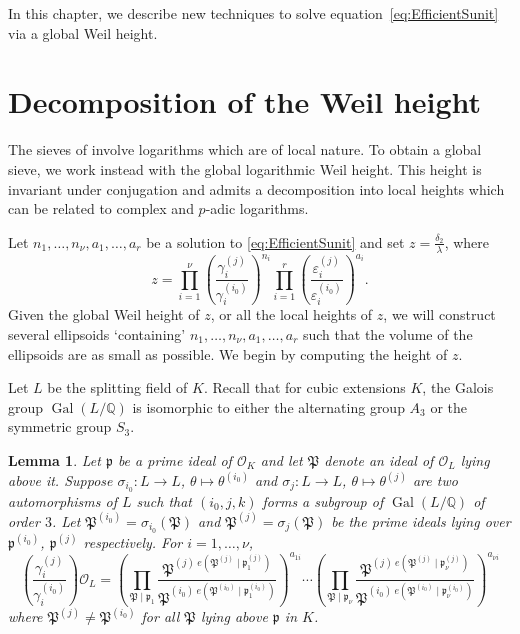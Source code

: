 \documentclass[11pt]{report}
\newtheorem{lemma}[theorem]{Lemma}
\theoremstyle{definition}
\DeclareMathOperator{\Gal}{Gal}
\begin{document}
In this chapter, we describe new techniques to solve equation~\eqref{eq:EfficientSunit} via a global Weil height.


\section{Decomposition of the Weil height}
\label{sec:decomp-weil-height}

The sieves of \cite{TW3} involve logarithms which are of local nature. To obtain a global sieve, we work instead with the global logarithmic Weil height. This height is invariant under conjugation and admits a decomposition into local heights which can be related to complex and $p$-adic logarithms.

Let $n_1, \dots, n_{\nu}, a_1, \dots, a_r$ be a solution to \eqref{eq:EfficientSunit} and set $z = \frac{\delta_2}{\lambda}$, where
\[z = \prod_{i = 1}^{\nu} \left( \frac{\gamma_i^{(j)}}{\gamma_i^{(i_0)}}\right)^{n_i}\prod_{i = 1}^{r}\left( \frac{\varepsilon_i^{(j)}}{\varepsilon_i^{(i_0)}}\right)^{a_i}.\]
Given the global Weil height of $z$, or all the local heights of $z$, we will construct several ellipsoids `containing' $n_1, \dots, n_{\nu}, a_1, \dots, a_r$ such that the volume of the ellipsoids are as small as possible. We begin by computing the height of $z$.

Let $L$ be the splitting field of $K$. Recall that for cubic extensions $K$, the Galois group $\Gal(L/\mathbb{Q})$ is isomorphic to either the alternating group $A_3$ or the symmetric group $S_3$.

\begin{lemma}\label{lem:cancellation}
Let $\mathfrak{p}$ be a prime ideal of $\mathcal{O}_K$ and let $\mathfrak{P}$ denote an ideal of $\mathcal{O}_L$ lying above it. Suppose $\sigma_{i_0}: L \to L$, $\theta \mapsto \theta^{(i_0)}$ and $\sigma_{j}: L \to L$, $\theta \mapsto \theta^{(j)}$ are two automorphisms of $L$ such that $(i_0,j,k)$ forms a subgroup of $\Gal(L/\mathbb{Q})$ of order $3$. Let $\mathfrak{P}^{(i_0)} = \sigma_{i_0}(\mathfrak{P})$ and $\mathfrak{P}^{(j)} = \sigma_{j}(\mathfrak{P})$ be the prime ideals lying over $\mathfrak{p}^{(i_0)}$, $\mathfrak{p}^{(j)}$ respectively. For $i = 1, \dots, \nu$,
\[\left( \frac{\gamma_i^{(j)}}{\gamma_i^{(i_0)}}\right)\mathcal{O}_L
	 = \left(\prod_{\mathfrak{P}\mid\mathfrak{p}_1} \frac{\mathfrak{P}^{(j) \ e(\mathfrak{P}^{(j)}\mid\mathfrak{p}_1^{(j)})}}{\mathfrak{P}^{(i_0) \ e(\mathfrak{P}^{(i_0)}\mid\mathfrak{p}^{(i_0)}_1)}}\right)^{a_{1i}} \cdots \left(\prod_{\mathfrak{P}\mid\mathfrak{p}_{\nu}} \frac{\mathfrak{P}^{(j) \ e(\mathfrak{P}^{(j)}\mid\mathfrak{p}^{(j)}_{\nu})}}{\mathfrak{P}^{(i_0) \ e(\mathfrak{P}^{(i_0)}\mid\mathfrak{p}^{(i_0)}_{\nu})}}\right)^{a_{\nu i}}\]
where $\mathfrak{P}^{(j)} \neq \mathfrak{P}^{(i_0)}$ for all $\mathfrak{P}$ lying above $\mathfrak{p}$ in $K$.
\end{lemma}
\end{document}
